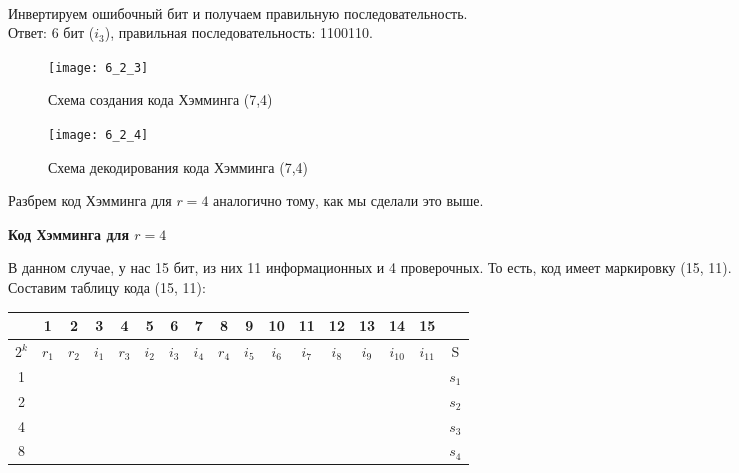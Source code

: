 \\Инвертируем ошибочный бит и получаем правильную последовательность.
\\Ответ: 6 бит ($i_3$), правильная последовательность: 1100110.
\begin{figure}
\texttt{[image: 6\_2\_3]}
\caption{Схема создания кода Хэмминга (7,4)}
\end{figure}
\begin{figure}
\texttt{[image: 6\_2\_4]}
\caption{Схема декодирования кода Хэмминга (7,4)}
\end{figure}
\newpage
Разбрем код Хэмминга для $r = 4$ аналогично тому, как мы сделали это выше.
\begin{center}
\textbf{Код Хэмминга для $r = 4$}
\end{center}
В данном случае, у нас 15 бит, из них 11 информационных и 4 проверочных. То есть, код имеет маркировку (15, 11).
\\Составим таблицу кода (15, 11):
\begin{table}[h]
\begin{tabular}{|c|c|c|c|c|c|c|c|c|c|c|c|c|c|c|c|c|}
\hline
& 1 & 2 & 3 & 4 & 5 & 6 & 7 & 8 & 9 & 10 & 11 & 12 & 13 & 14 & 15 & \\
\hline
$2^k$ & $r_{1}$ & $r_{2}$ & $i_{1}$ & $r_{3}$ & $i_{2}$ & $i_{3}$ & $i_{4}$ & $r_{4}$ & $i_{5}$ & $i_{6}$ & $i_{7}$ & $i_{8}$ & $i_{9}$ & $i_{10}$& $i_{11}$ &S\\
\hline
1 & \cellcolor{Gray1}{X} & & \cellcolor{Gray1}{X} & & \cellcolor{Gray1}{X} & & \cellcolor{Gray1}{X} & & \cellcolor{Gray1}{X} & & \cellcolor{Gray1}{X} & & \cellcolor{Gray1}{X} & & \cellcolor{Gray1}{X} & $s_{1}$\\
\hline
2 & & \cellcolor{Gray2}{X} & \cellcolor{Gray2}{X} & & & \cellcolor{Gray2}{X} & \cellcolor{Gray2}{X} & & & \cellcolor{Gray2}{X} & \cellcolor{Gray2}{X} & & & \cellcolor{Gray2}{X} & \cellcolor{Gray2}{X} & $s_{2}$ \\
\hline
4 & & & & \cellcolor{Gray3}{X} & \cellcolor{Gray3}{X} & \cellcolor{Gray3}{X} & \cellcolor{Gray3}{X} & & & & & \cellcolor{Gray3}{X} & \cellcolor{Gray3}{X} & \cellcolor{Gray3}{X} & \cellcolor{Gray3}{X} & $s_{3}$ \\
\hline
8 & & & & & & & & \cellcolor{Gray4}{X} & \cellcolor{Gray4}{X} & \cellcolor{Gray4}{X} & \cellcolor{Gray4}{X} & \cellcolor{Gray4}{X} & \cellcolor{Gray4}{X} & \cellcolor{Gray4}{X} & \cellcolor{Gray4}{X} & $s_{4}$\\
\hline
\end{tabular}
\end{table}
